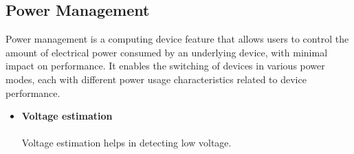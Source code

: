 \subsection{Power Management}

Power management is a computing device feature that allows users to control the amount of electrical power consumed by an underlying device, with minimal impact on performance. It enables the switching of devices in various power modes, each with different power usage characteristics related to device performance.

\begin{itemize}[wide, labelwidth=!, labelindent=0pt]
    \item \textbf{Voltage estimation}
    \vspace{-0.5cm}
    \paragraph{} Voltage estimation helps in detecting low voltage.
    \begin{figure}[h]
\end{figure}
\end{itemize}
